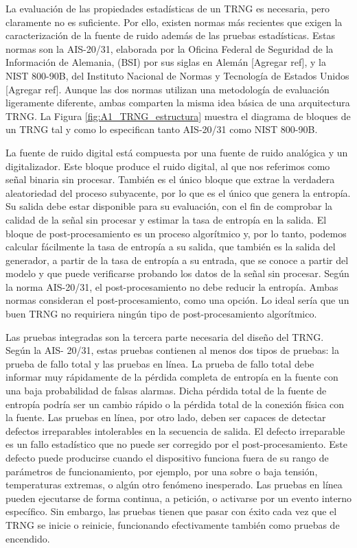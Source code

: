 	            La evaluación de las propiedades estadísticas de un TRNG es necesaria, pero claramente no es suficiente. Por ello, existen normas más recientes que exigen la caracterización de la fuente de ruido además de las pruebas estadísticas. Estas normas son la AIS-20/31, elaborada por la Oficina Federal de Seguridad de la Información de Alemania, (BSI) por sus siglas en Alemán [Agregar ref], y la NIST 800-90B, del Instituto Nacional de Normas y Tecnología de Estados Unidos [Agregar ref]. Aunque las dos normas utilizan una metodología de evaluación ligeramente diferente, ambas comparten la misma idea básica de una arquitectura TRNG. La Figura \ref{fig:A1_TRNG_estructura} muestra el diagrama de bloques de un TRNG tal y como lo especifican tanto AIS-20/31 como NIST 800-90B.
	
	            La fuente de ruido digital está compuesta por una fuente de ruido analógica y un digitalizador. Este bloque produce el ruido digital, al que nos referimos como señal binaria sin procesar. También es el único bloque que extrae la verdadera aleatoriedad del proceso subyacente, por lo que es el único que genera la entropía. Su salida debe estar disponible para su evaluación, con el fin de comprobar la calidad de la señal sin procesar y estimar la tasa de entropía en la salida. El bloque de post-procesamiento es un proceso algorítmico y, por lo tanto, podemos calcular fácilmente la tasa de entropía a su salida, que también es la salida del generador, a partir de la tasa de entropía a su entrada, que se conoce a partir del modelo y que puede verificarse probando los datos de la señal sin procesar. Según la norma AIS-20/31, el post-procesamiento no debe reducir la entropía. Ambas normas consideran el post-procesamiento, como una opción. Lo ideal sería que un buen TRNG no requiriera ningún tipo de post-procesamiento algorítmico.
	
	            Las pruebas integradas son la tercera parte necesaria del diseño del TRNG. Según la AIS- 20/31, estas pruebas contienen al menos dos tipos de pruebas: la prueba de fallo total y las pruebas en línea. La prueba de fallo total debe informar muy rápidamente de la pérdida completa de entropía en la fuente con una baja probabilidad de falsas alarmas. Dicha pérdida total de la fuente de entropía podría ser un cambio rápido o la pérdida total de la conexión física con la fuente. Las pruebas en línea, por otro lado, deben ser capaces de detectar defectos irreparables intolerables en la secuencia de salida. El defecto irreparable es un fallo estadístico que no puede ser corregido por el post-procesamiento. Este defecto puede producirse cuando el dispositivo funciona fuera de su rango de parámetros de funcionamiento, por ejemplo, por una sobre o baja tensión, temperaturas extremas, o algún otro fenómeno inesperado. Las pruebas en línea pueden ejecutarse de forma continua, a petición, o activarse por un evento interno específico. Sin embargo, las pruebas tienen que pasar con éxito cada vez que el TRNG se inicie o reinicie, funcionando efectivamente también como pruebas de encendido.

